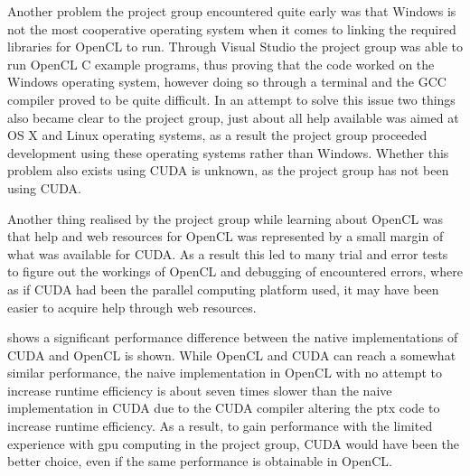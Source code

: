Another problem the project group encountered quite early was that Windows is not the most cooperative operating system when it comes to linking the required libraries for OpenCL to run.
Through Visual Studio the project group was able to run OpenCL C example programs, thus proving that the code worked on the Windows operating system, however doing so through a terminal and the GCC compiler proved to be quite difficult. 
In an attempt to solve this issue two things also became clear to the project group, just about all help available was aimed at OS X and Linux operating systems, as a result the project group proceeded development using these operating systems rather than Windows.
Whether this problem also exists using CUDA is unknown, as the project group has not been using CUDA. 

Another thing realised by the project group while learning about OpenCL was that help and web resources for OpenCL was represented by a small margin of what was available for CUDA.
As a result this led to many trial and error tests to figure out the workings of OpenCL and debugging of encountered errors, where as if CUDA had been the parallel computing platform used, it may have been easier to acquire help through web resources.

 shows a significant performance difference between the native implementations of CUDA and OpenCL is shown.
While OpenCL and CUDA can reach a somewhat similar performance, the naive implementation in OpenCL with no attempt to increase runtime efficiency is about seven times slower than the naive implementation in CUDA due to the CUDA compiler altering the \acrshort{ptx} code to increase runtime efficiency.
As a result, to gain performance with the limited experience with \acrshort{gpu} computing in the project group, CUDA would have been the better choice, even if the same performance is obtainable in OpenCL.


